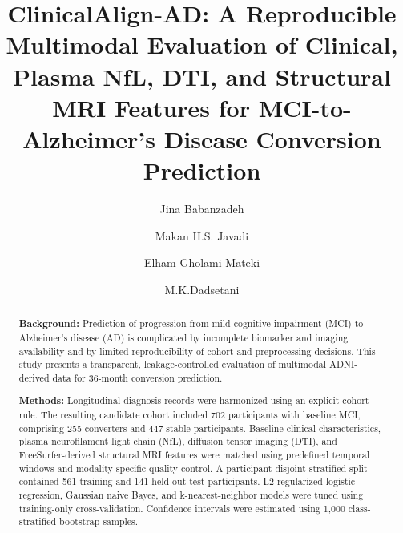 \documentclass[preprint,12pt]{elsarticle}
\begin{document}
\begin{frontmatter}

\title{ClinicalAlign-AD: A Reproducible Multimodal Evaluation of Clinical, Plasma NfL, DTI, and Structural MRI Features for MCI-to-Alzheimer's Disease Conversion Prediction}

\author[inst1]{Jina Babanzadeh}
\author[inst2]{Makan H.S. Javadi}
\author[inst3]{Elham Gholami Mateki}
\author[inst4]{M.K.Dadsetani}





\begin{abstract}

\textbf{Background:}
Prediction of progression from mild cognitive impairment (MCI) to Alzheimer's disease (AD) is complicated by incomplete biomarker and imaging availability and by limited reproducibility of cohort and preprocessing decisions. This study presents a transparent, leakage-controlled evaluation of multimodal ADNI-derived data for 36-month conversion prediction.

\textbf{Methods:}
Longitudinal diagnosis records were harmonized using an explicit cohort rule. The resulting candidate cohort included 702 participants with baseline MCI, comprising 255 converters and 447 stable participants. Baseline clinical characteristics, plasma neurofilament light chain (NfL), diffusion tensor imaging (DTI), and FreeSurfer-derived structural MRI features were matched using predefined temporal windows and modality-specific quality control. A participant-disjoint stratified split contained 561 training and 141 held-out test participants. L2-regularized logistic regression, Gaussian naive Bayes, and k-nearest-neighbor models were tuned using training-only cross-validation. Confidence intervals were estimated using 1,000 class-stratified bootstrap samples.


\end{abstract}
\end{frontmatter}
\end{document}
